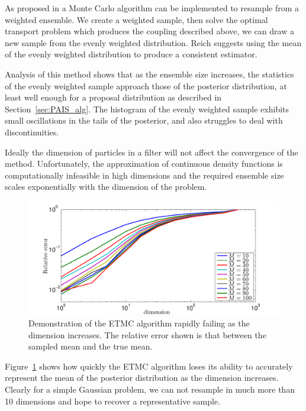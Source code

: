 \documentclass[final]{siamltex}
\begin{document}
As proposed in \cite{reich2013nonparametric} a Monte Carlo algorithm can be implemented to resample from a weighted ensemble. We create a weighted sample, then solve the optimal transport problem which produces the coupling described above, we can draw a new sample from the evenly weighted distribution. Reich suggests using the mean of the evenly weighted distribution to produce a consistent estimator.

Analysis of this method shows that as the ensemble size increases, the statistics of the evenly weighted sample approach those of the posterior distribution, at least well enough for a proposal distribution as described in Section~\ref{sec:PAIS_alg}. The histogram of the evenly weighted sample exhibits small oscillations in the tails of the posterior, and also struggles to deal with discontinuities.

Ideally the dimension of particles in a filter will not affect the convergence of the method. Unfortunately, the approximation of continuous density functions is computationally infeasible in high dimensions and the required ensemble size scales exponentially with the dimension of the problem\cite{silverman1986density,snyder2008obstacles}.

\begin{figure}[htb]
\begin{center}
\includegraphics[width=\textwidth]{figures/ET_dim_scaling}
\caption{Demonstration of the ETMC algorithm rapidly failing as the dimension increases. The relative error shown is that between the sampled mean and the true mean.}
\label{fig:ET_dim_scaling}
\end{center}
\end{figure}

Figure~\ref{fig:ET_dim_scaling} shows how quickly the ETMC algorithm loses its ability to accurately represent the mean of the posterior distribution as the dimension increases. Clearly for a simple Gaussian problem, we can not resample in much more than 10 dimensions and hope to recover a representative sample.
\end{document}
